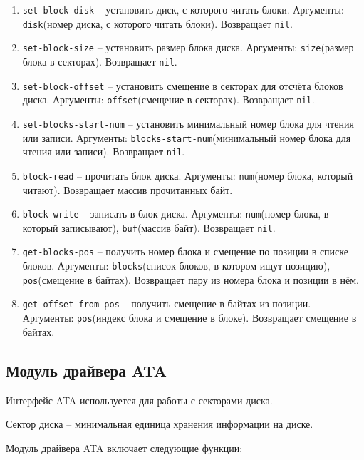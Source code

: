 \begin{enumerate}
	\item \texttt{set-block-disk} -- установить диск, с которого читать блоки. Аргументы: \texttt{disk}(номер диска, с которого читать блоки). Возвращает \texttt{nil}.
	\item \texttt{set-block-size} -- установить размер блока диска. Аргументы: \texttt{size}(размер блока в секторах). Возвращает \texttt{nil}.
	\item \texttt{set-block-offset} -- установить смещение в секторах для отсчёта блоков диска. Аргументы: \texttt{offset}(смещение в секторах). Возвращает \texttt{nil}.
	\item \texttt{set-blocks-start-num} -- установить минимальный номер блока для чтения или записи. Аргументы: \texttt{blocks-start-num}(минимальный номер блока для чтения или записи). Возвращает \texttt{nil}.
	\item \texttt{block-read} -- прочитать блок диска. Аргументы: \texttt{num}(номер блока, который читают). Возвращает массив прочитанных байт.
	\item \texttt{block-write} -- записать в блок диска. Аргументы: \texttt{num}(номер блока, в который записывают), \texttt{buf}(массив байт). Возвращает \texttt{nil}.
	\item \texttt{get-blocks-pos} -- получить номер блока и смещение по позиции в списке блоков. Аргументы: \texttt{blocks}(список блоков, в котором ищут позицию), \texttt{pos}(смещение в байтах). Возвращает пару из номера блока и позиции в нём.
	\item \texttt{get-offset-from-pos} -- получить смещение в байтах из позиции. Аргументы: \texttt{pos}(индекс блока и смещение в блоке). Возвращает смещение в байтах.
\end{enumerate}

\subsection{Модуль драйвера ATA}

Интерфейс ATA используется для работы с секторами диска.

Сектор диска -- минимальная единица хранения информации на диске.

Модуль драйвера ATA включает следующие функции:

